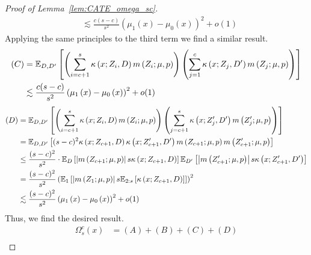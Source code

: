 \begin{proof}[Proof of Lemma~\ref{lem:CATE_omega_sc}]
\begin{equation}
\begin{aligned}
			& \lesssim \frac{c(s-c)}{s^2}\left(\mu_{1}\left(x\right) - \mu_{0}\left(x\right)\right)^2  + o(1)
		\end{aligned}
	\end{equation}
	Applying the same principles to the third term we find a similar result.
	\begin{equation}
		\begin{aligned}
			(C)
			& = \mathbb{E}_{D, D^{\prime}}\left[\left(\sum_{i = c + 1}^{s} \kappa\left(x; Z_{i}, D\right) m\left(Z_{i}; \mu, p\right)\right)
            \left(\sum_{j = 1}^{c} \kappa\left(x; Z_{j}, D^{\prime}\right) m\left(Z_{j}; \mu, p\right)\right)\right]\\
			& \lesssim \frac{c(s-c)}{s^2}\left(\mu_{1}\left(x\right) - \mu_{0}\left(x\right)\right)^2  + o(1)
		\end{aligned}
	\end{equation}
	\begin{equation}
		\begin{aligned}
			(D)
			& = \mathbb{E}_{D, D^{\prime}}\left[\left(\sum_{i = c + 1}^{s} \kappa\left(x; Z_{i}, D\right) m\left(Z_{i}; \mu, p\right)\right)
            \left(\sum_{j = c + 1}^{s} \kappa\left(x; Z_{j}^{\prime}, D^{\prime}\right) m\left(Z_{j}^{\prime}; \mu, p\right)\right)\right] \\
			& = \mathbb{E}_{D, D^{\prime}}\left[(s-c)^2 \kappa\left(x; Z_{c+1}, D\right)\kappa\left(x; Z_{c+1}^{\prime}, D^{\prime}\right)
			 m\left(Z_{c+1}; \mu, p\right)  m\left(Z_{c+1}^{\prime}; \mu, p\right)\right] \\
			 & \leq \frac{(s-c)^2}{s^2} \cdot \mathbb{E}_{D}\left[\left|m\left(Z_{c+1}; \mu, p\right)\right| s \kappa\left(x; Z_{c+1}, D\right)\right]
			 \mathbb{E}_{D^{\prime}}\left[\left|m\left(Z_{c+1}^{\prime}; \mu, p\right)\right| s \kappa\left(x; Z_{c+1}^{\prime}, D^{\prime}\right) \right]\\
			 & = \frac{(s-c)^2}{s^2} \left(\mathbb{E}_{1}\left[\left|m\left(Z_{1}; \mu, p\right)\right| s \mathbb{E}_{2:s}\left[\kappa\left(x; Z_{c+1}, D\right)\right]\right]\right)^2 \\
			 & \lesssim \frac{(s-c)^2}{s^2}\left(\mu_{1}\left(x\right) - \mu_{0}\left(x\right)\right)^2  + o(1)
		\end{aligned}
	\end{equation}
	Thus, we find the desired result.
	\begin{equation}
		\begin{aligned}
			\Omega_{s}^{c}\left(x\right)
			& = (A) + (B) + (C) + (D) \\

\end{aligned}
\end{equation}
\end{proof}
